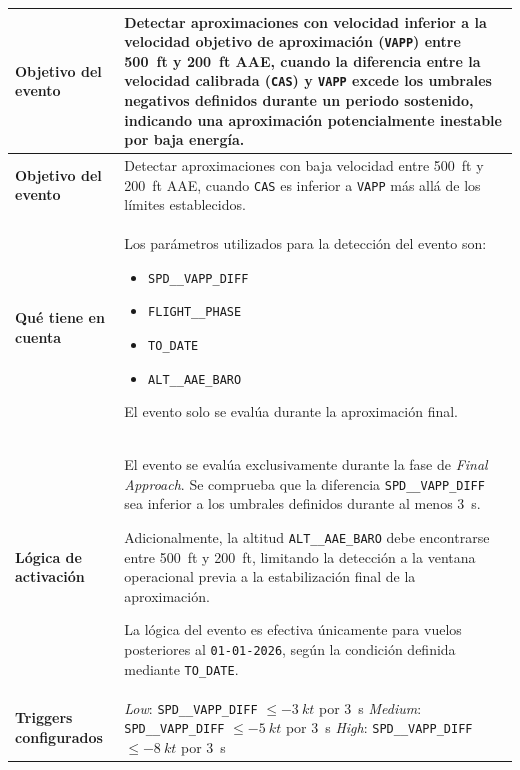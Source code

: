 \documentclass[11pt,a4paper]{article}
\begin{document}
	\renewcommand{\arraystretch}{1.3}
	\begin{longtable}{p{5cm} p{9.5cm}}
		\hline
		\textbf{Objetivo del evento} &
		Detectar aproximaciones con velocidad inferior a la velocidad objetivo de aproximación (\texttt{VAPP}) entre \SI{500}{ft} y \SI{200}{ft} AAE, cuando la diferencia entre la velocidad calibrada (\texttt{CAS}) y \texttt{VAPP} excede los umbrales negativos definidos durante un periodo sostenido, indicando una aproximación potencialmente inestable por baja energía. \\
		\hline
		\endfirsthead
		
		\hline
		\textbf{Objetivo del evento} &
		Detectar aproximaciones con baja velocidad entre \SI{500}{ft} y \SI{200}{ft} AAE, cuando \texttt{CAS} es inferior a \texttt{VAPP} más allá de los límites establecidos. \\
		\hline
		\endhead
		
		\hline
		\endfoot
		
		\hline
		\endlastfoot
		
		\textbf{Qué tiene en cuenta} &
		Los parámetros utilizados para la detección del evento son:
		\begin{itemize}
			\item \texttt{SPD\_\_VAPP\_DIFF}
			\item \texttt{FLIGHT\_\_PHASE}
			\item \texttt{TO\_DATE}
			\item \texttt{ALT\_\_AAE\_BARO}
		\end{itemize}
		El evento solo se evalúa durante la aproximación final. \\
		\hline
		
		\textbf{Lógica de activación} &
		El evento se evalúa exclusivamente durante la fase de \textit{Final Approach}.  
		Se comprueba que la diferencia \texttt{SPD\_\_VAPP\_DIFF} sea inferior a los umbrales definidos durante al menos \SI{3}{s}.  
		
		Adicionalmente, la altitud \texttt{ALT\_\_AAE\_BARO} debe encontrarse entre \SI{500}{ft} y \SI{200}{ft}, limitando la detección a la ventana operacional previa a la estabilización final de la aproximación.  
		
		La lógica del evento es efectiva únicamente para vuelos posteriores al \texttt{01-01-2026}, según la condición definida mediante \texttt{TO\_DATE}. \\
		\hline
		
		\textbf{Triggers configurados} &
		\textit{Low}: \texttt{SPD\_\_VAPP\_DIFF} $\le \SI{-3}{kt}$ por \SI{3}{s} \newline
		\textit{Medium}: \texttt{SPD\_\_VAPP\_DIFF} $\le \SI{-5}{kt}$ por \SI{3}{s} \newline
		\textit{High}: \texttt{SPD\_\_VAPP\_DIFF} $\le \SI{-8}{kt}$ por \SI{3}{s} \\
		\hline
		

\end{longtable}
\end{document}
